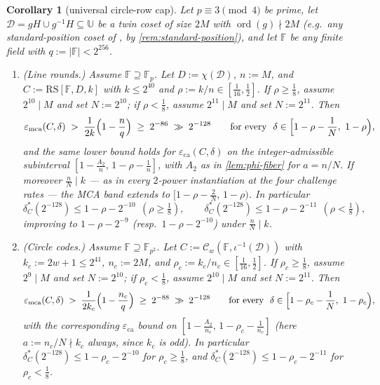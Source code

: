 \documentclass[11pt]{article}
\newtheorem{corollary}[theorem]{Corollary}
\theoremstyle{definition}
\theoremstyle{remark}
\newcommand{\F}{\mathbb{F}}
\newcommand{\RS}{\mathrm{RS}}
\newcommand{\eca}{\varepsilon_{\mathrm{ca}}}
\newcommand{\emca}{\varepsilon_{\mathrm{mca}}}
\newcommand{\UU}{\mathbb{U}}
\begin{document}
\begin{corollary}[universal circle-row cap]\label{cor:circle-grand}
Let $p\equiv3\pmod4$ be prime, let $\mathcal D=gH\cup g^{-1}H\subseteq\UU$ be a twin coset of size $2M$ with $\operatorname{ord}(g)\nmid2M$ \textup(e.g.\ any standard-position coset of \cite{HLP24}, by \cref{rem:standard-position}\textup), and let $\F$ be any finite field with $q:=|\F|<2^{256}$.
\begin{enumerate}[label=\textup{(\alph*)}]
\item \textup{(Line rounds.)} Assume $\F\supseteq\F_p$. Let $D:=\chi(\mathcal D)$, $n:=M$, and $C:=\RS[\F,D,k]$ with $k\le2^{40}$ and $\rho:=k/n\in[\tfrac1{16},\tfrac12]$. If $\rho\ge\frac18$, assume $2^{10}\mid M$ and set $N:=2^{10}$; if $\rho<\frac18$, assume $2^{11}\mid M$ and set $N:=2^{11}$. Then
\[
\emca(C,\delta)\;>\;\frac1{2k}\Bigl(1-\frac nq\Bigr)\;\ge\;2^{-86}\;\gg\;2^{-128}
\qquad\text{for every }\ \delta\in\Bigl[1-\rho-\frac1N,\ 1-\rho\Bigr),
\]
and the same lower bound holds for $\eca(C,\delta)$ on the integer-admissible subinterval $[1-\frac{A_2}n,\,1-\rho-\frac1n]$, with $A_2$ as in \cref{lem:phi-fiber} for $a=n/N$. If moreover $\frac nN\mid k$ --- as in every $2$-power instantiation at the four challenge rates --- the MCA band extends to $[1-\rho-\frac2N,\,1-\rho)$. In particular
\[
\delta^*_C(2^{-128})\le1-\rho-2^{-10}\ \ (\rho\ge\tfrac18),
\qquad
\delta^*_C(2^{-128})\le1-\rho-2^{-11}\ \ (\rho<\tfrac18),
\]
improving to $1-\rho-2^{-9}$ \textup(resp.\ $1-\rho-2^{-10}$\textup) under $\frac nN\mid k$.
\item \textup{(Circle codes.)} Assume $\F\supseteq\F_{p^2}$. Let $C:=\mathcal C_w(\F,\iota^{-1}(\mathcal D))$ with $k_c:=2w+1\le2^{41}$, $n_c:=2M$, and $\rho_c:=k_c/n_c\in[\tfrac1{16},\tfrac12]$. If $\rho_c\ge\frac18$, assume $2^{9}\mid M$ and set $N:=2^{10}$; if $\rho_c<\frac18$, assume $2^{10}\mid M$ and set $N:=2^{11}$. Then
\[
\emca(C,\delta)\;>\;\frac1{2k_c}\Bigl(1-\frac{n_c}q\Bigr)\;\ge\;2^{-88}\;\gg\;2^{-128}
\qquad\text{for every }\ \delta\in\Bigl[1-\rho_c-\frac1N,\ 1-\rho_c\Bigr),
\]
with the corresponding $\eca$ bound on $[1-\frac{A_2}{n_c},\,1-\rho_c-\frac1{n_c}]$ \textup(here $a:=n_c/N\nmid k_c$ always, since $k_c$ is odd\textup). In particular $\delta^*_C(2^{-128})\le1-\rho_c-2^{-10}$ for $\rho_c\ge\frac18$, and $\delta^*_C(2^{-128})\le1-\rho_c-2^{-11}$ for $\rho_c<\frac18$.
\end{enumerate}
\end{corollary}
\end{document}
